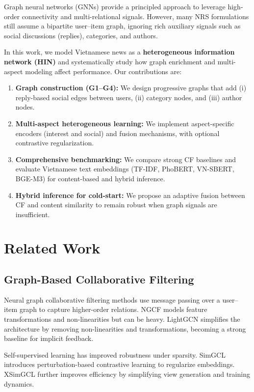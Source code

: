 \documentclass[11pt]{article}
\begin{document}
Graph neural networks (GNNs) provide a principled approach to leverage high-order connectivity and multi-relational signals. However, many NRS formulations still assume a bipartite user--item graph, ignoring rich auxiliary signals such as social discussions (replies), categories, and authors.

In this work, we model Vietnamese news as a \textbf{heterogeneous information network (HIN)} and systematically study how graph enrichment and multi-aspect modeling affect performance. Our contributions are:
\begin{enumerate}[leftmargin=*]
  \item \textbf{Graph construction (G1--G4):} We design progressive graphs that add (i) reply-based social edges between users, (ii) category nodes, and (iii) author nodes.
  \item \textbf{Multi-aspect heterogeneous learning:} We implement aspect-specific encoders (interest and social) and fusion mechanisms, with optional contrastive regularization.
  \item \textbf{Comprehensive benchmarking:} We compare strong CF baselines and evaluate Vietnamese text embeddings (TF-IDF, PhoBERT, VN-SBERT, BGE-M3) for content-based and hybrid inference.
  \item \textbf{Hybrid inference for cold-start:} We propose an adaptive fusion between CF and content similarity to remain robust when graph signals are insufficient.
\end{enumerate}

\section{Related Work}
\subsection{Graph-Based Collaborative Filtering}
Neural graph collaborative filtering methods use message passing over a user--item graph to capture higher-order relations. NGCF \citet{wang2019neural} models feature transformations and non-linearities but can be heavy. LightGCN \citet{he2020lightgcn} simplifies the architecture by removing non-linearities and transformations, becoming a strong baseline for implicit feedback.

Self-supervised learning has improved robustness under sparsity. SimGCL \citet{yu2022graph} introduces perturbation-based contrastive learning to regularize embeddings. XSimGCL further improves efficiency by simplifying view generation and training dynamics.
\end{document}
